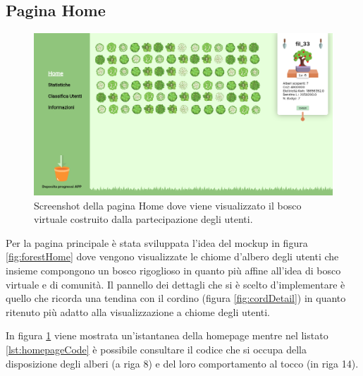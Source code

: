 \subsection{Pagina Home}
\begin{figure}[h!]
  \centering
  \includegraphics[width=\textwidth]{img/totem/screenshot/homepage.png}
  \caption{Screenshot della pagina Home dove viene visualizzato il bosco virtuale costruito dalla partecipazione degli utenti.}
  \label{fig:homepage}
\end{figure}
Per la pagina principale è stata sviluppata l'idea del mockup in figura \ref{fig:forestHome} dove vengono visualizzate le chiome d'albero degli utenti che insieme compongono un bosco rigoglioso in quanto più affine all'idea di bosco virtuale e di comunità. 
Il pannello dei dettagli che si è scelto d'implementare è quello che ricorda una tendina con il cordino (figura \ref{fig:cordDetail}) in quanto ritenuto più adatto alla visualizzazione a chiome degli utenti.

In figura \ref{fig:homepage} viene mostrata un'istantanea della homepage mentre nel listato \ref{lst:homepageCode} è possibile consultare il codice che si occupa della disposizione degli alberi (a riga 8) e del loro comportamento al tocco (in riga 14).
\vspace{\baselineskip}

